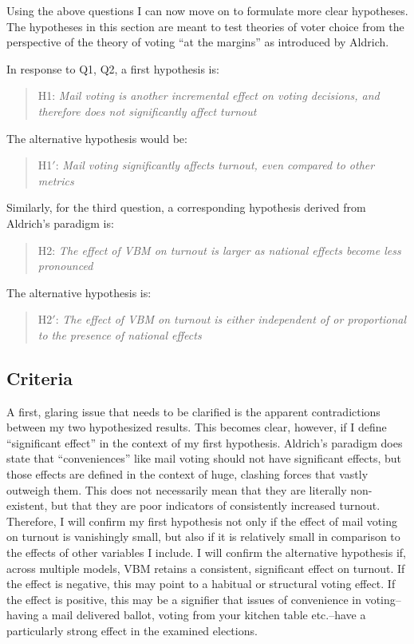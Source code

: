 \documentclass[12pt,twoside]{reedthesis}
\begin{document}
  Using the above questions I can now move on to formulate more clear
  hypotheses. The hypotheses in this section are meant to test theories of
  voter choice from the perspective of the theory of voting ``at the
  margins'' as introduced by Aldrich.
  
  In response to Q1, Q2, a first hypothesis is:
  
  \begin{quotation}  
  H1: \textit{Mail voting is another incremental effect on voting decisions, and therefore
  does not significantly affect turnout}
  \end{quotation}
  
  The alternative hypothesis would be:
  
  \begin{quotation}  
  H1$'$: \textit{Mail  voting  significantly  affects  turnout,  even  compared  to  other  metrics}
  \end{quotation}
  
  Similarly, for the third question, a corresponding hypothesis derived
  from Aldrich's paradigm is:
  
  \begin{quotation}  
  H2: \textit{The  effect  of  VBM  on  turnout  is  larger  as  national  effects  become less pronounced}
  \end{quotation}
  
  The alternative hypothesis is:
  
  \begin{quotation}  
  H2$'$: \textit{The  effect  of  VBM  on  turnout  is either independent of or proportional to the presence of national effects}
  \end{quotation}
  
  \subsection{Criteria}\label{criteria}
  
  A first, glaring issue that needs to be clarified is the apparent
  contradictions between my two hypothesized results. This becomes clear,
  however, if I define ``significant effect'' in the context of my first
  hypothesis. Aldrich's paradigm does state that ``conveniences'' like
  mail voting should not have significant effects, but those effects are
  defined in the context of huge, clashing forces that vastly outweigh
  them. This does not necessarily mean that they are literally
  non-existent, but that they are poor indicators of consistently
  increased turnout. Therefore, I will confirm my first hypothesis not
  only if the effect of mail voting on turnout is vanishingly small, but
  also if it is relatively small in comparison to the effects of other
  variables I include. I will confirm the alternative hypothesis if,
  across multiple models, VBM retains a consistent, significant effect on
  turnout. If the effect is negative, this may point to a habitual or
  structural voting effect. If the effect is positive, this may be a
  signifier that issues of convenience in voting--having a mail delivered
  ballot, voting from your kitchen table etc.--have a particularly strong
  effect in the examined elections.
  
\end{document}
